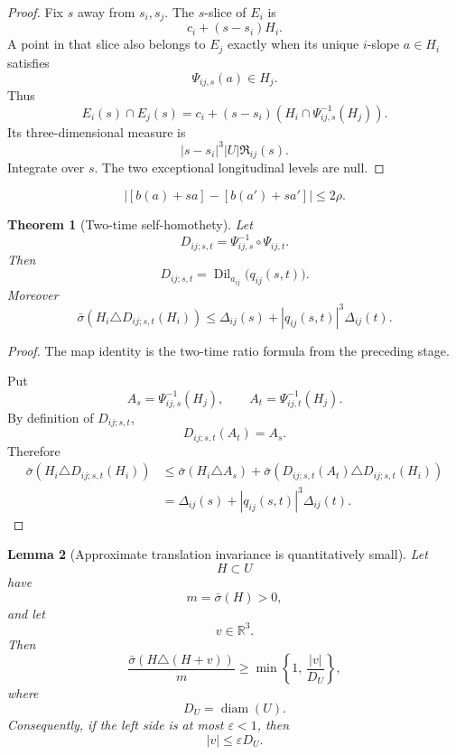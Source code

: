 \documentclass[10pt]{article}
\newtheorem{theorem}{Theorem}[section]
\newtheorem{lemma}[theorem]{Lemma}
\newcommand{\R}{\mathbb R}
\begin{document}
\begin{proof}
Fix \(s\) away from \(s_i,s_j\).  The \(s\)-slice of \(E_i\) is
\[
c_i+(s-s_i)H_i.
\]
A point in that slice also belongs to \(E_j\) exactly when its unique \(i\)-slope \(a\in H_i\)
satisfies
\[
\Psi_{ij,s}(a)\in H_j.
\]
Thus
\[
E_i(s)\cap E_j(s)
=
c_i+(s-s_i)
\left(
H_i\cap\Psi_{ij,s}^{-1}(H_j)
\right).
\]
Its three-dimensional measure is
\[
|s-s_i|^3
|U|
\mathfrak R_{ij}(s).
\]
Integrate over \(s\).  The two exceptional longitudinal levels are null.
\end{proof}

\begin{equation}
\label{eq:v014-secondary-collision}
\boxed{
|
[b(a)+sa]
-
[b(a')+sa']
|
\le
2\rho.
}
\end{equation}

\begin{theorem}[Two-time self-homothety]
\label{thm:v016-two-time-self}
Let
\[
D_{ij;s,t}
=
\Psi_{ij,s}^{-1}\circ\Psi_{ij,t}.
\]
Then
\begin{equation}
\label{eq:v016-two-time-self-map}
\boxed{
D_{ij;s,t}
=
\operatorname{Dil}_{a_{ij}}
\bigl(q_{ij}(s,t)\bigr).
}
\end{equation}
Moreover
\begin{equation}
\label{eq:v016-two-time-defect}
\boxed{
\bar\sigma
\left(
H_i
\triangle
D_{ij;s,t}(H_i)
\right)
\le
\Delta_{ij}(s)
+
|q_{ij}(s,t)|^3
\Delta_{ij}(t).
}
\end{equation}
\end{theorem}

\begin{proof}
The map identity is the two-time ratio formula from the preceding stage.

Put
\[
A_s
=
\Psi_{ij,s}^{-1}(H_j),
\qquad
A_t
=
\Psi_{ij,t}^{-1}(H_j).
\]
By definition of \(D_{ij;s,t}\),
\[
D_{ij;s,t}(A_t)=A_s.
\]
Therefore
\[
\begin{aligned}
\bar\sigma
\left(
H_i\triangle D_{ij;s,t}(H_i)
\right)
&\le
\bar\sigma(H_i\triangle A_s)
+
\bar\sigma
\left(
D_{ij;s,t}(A_t)
\triangle
D_{ij;s,t}(H_i)
\right)\\
&=
\Delta_{ij}(s)
+
|q_{ij}(s,t)|^3
\Delta_{ij}(t).
\end{aligned}
\]
\end{proof}

\begin{lemma}[Approximate translation invariance is quantitatively small]
\label{lem:v016-translation-rigidity}
Let
\[
H\subset U
\]
have
\[
m=\bar\sigma(H)>0,
\]
and let
\[
v\in\R^3.
\]
Then
\begin{equation}
\label{eq:v016-translation-rigidity}
\boxed{
\frac{
\bar\sigma
\left(
H\triangle(H+v)
\right)
}{m}
\ge
\min
\left\{
1,\,
\frac{|v|}{D_U}
\right\},
}
\end{equation}
where
\[
D_U=\operatorname{diam}(U).
\]
Consequently, if the left side is at most \(\varepsilon<1\), then
\begin{equation}
\label{eq:v016-translation-small}
\boxed{
|v|
\le
\varepsilon D_U.
}
\end{equation}
\end{lemma}
\end{document}
